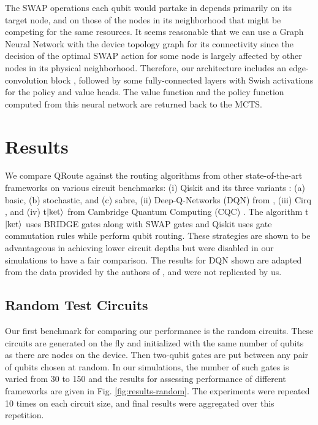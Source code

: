 \documentclass[%
 reprint,
amsmath,amssymb,
pra,
]{revtex4-2}
\begin{document}
The SWAP operations each qubit would partake in depends primarily on its target node, and on those of the nodes in its neighborhood that might be competing for the same resources. It seems reasonable that we can use a Graph Neural Network with the device topology graph for its connectivity since the decision of the optimal SWAP action for some node is largely affected by other nodes in its physical neighborhood. Therefore, our architecture includes an edge-convolution block \citep{nn_edge_conv}, followed by some fully-connected layers with Swish \citep{nn_swish} activations for the policy and value heads. The value function and the policy function computed from this neural network are returned back to the MCTS.

\section{\label{sec:results}Results}
We compare QRoute against the routing algorithms from other state-of-the-art frameworks on various circuit benchmarks: (i) Qiskit and its three variants \citep{comp_qiskit}: (a) basic, (b) stochastic, and (c) sabre, (ii) Deep-Q-Networks (DQN) from \citep{qroute_dqn2}, (iii) Cirq \citep{comp_cirq}, and (iv) t$\ket{\text{ket}}$ from Cambridge Quantum Computing (CQC) \citep{comp_pytket}. The algorithm t$\ket{\text{ket}}$ uses BRIDGE gates along with SWAP gates and Qiskit uses gate commutation rules while perform qubit routing. These strategies are shown to be advantageous in achieving lower circuit depths \citep{bridge_gate} but were disabled in our simulations to have a fair comparison. The results for DQN shown are adapted from the data provided by the authors of \citet{qroute_dqn2}, and were not replicated by us.

\subsection{\label{sec:results-random}Random Test Circuits}

Our first benchmark for comparing our performance is the random circuits. These circuits are generated on the fly and initialized with the same number of qubits as there are nodes on the device. Then two-qubit gates are put between any pair of qubits chosen at random. In our simulations, the number of such gates is varied from 30 to 150 and the results for assessing performance of different frameworks are given in Fig. \ref{fig:results-random}. The experiments were repeated 10 times on each circuit size, and final results were aggregated over this repetition. 
\end{document}
